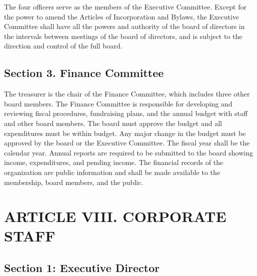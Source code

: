 \documentclass[a4paper]{article}
\begin{document}
The four officers serve as the members of the Executive Committee. Except for the power to amend the Articles of Incorporation and Bylaws, the Executive Committee shall have all the powers and authority of the board of directors in the intervals between meetings of the board of directors, and is subject to the direction and control of the full board.

\subsection*{Section 3. Finance Committee}

The treasurer is the chair of the Finance Committee, which includes three other board members. The Finance Committee is responsible for developing and reviewing fiscal procedures, fundraising plans, and the annual budget with staff and other board members. The board must approve the budget and all expenditures must be within budget. Any major change in the budget must be approved by the board or the Executive Committee. The fiscal year shall be the calendar year. Annual reports are required to be submitted to the board showing income, expenditures, and pending income. The financial records of the organization are public information and shall be made available to the membership, board members, and the public.

\section*{ARTICLE VIII. CORPORATE STAFF}


\subsection*{Section 1: Executive Director}
\end{document}
